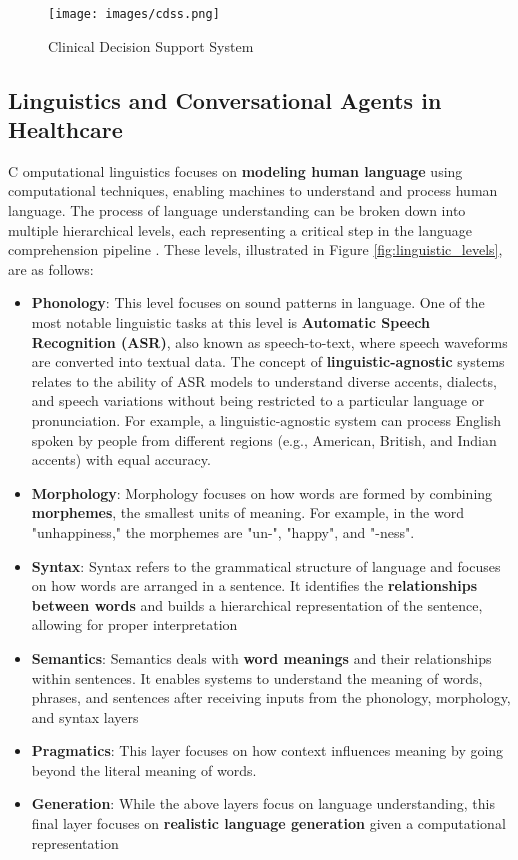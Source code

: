\begin{figure}[h]
    \centering
    \texttt{[image: images/cdss.png]}
    \caption{Clinical Decision Support System}
    \label{fig:cdss}
\end{figure}

\subsection{Linguistics and Conversational Agents in Healthcare}
\lettrine{C}{ }omputational linguistics focuses on \textcolor{TUMRed}{\textbf{modeling human language}} using computational techniques, enabling machines to understand and process human language. The process of language understanding can be broken down into multiple hierarchical levels, each representing a critical step in the language comprehension pipeline \cite{cohen2022intelligent}. These levels, illustrated in Figure \ref{fig:linguistic_levels}, are as follows:
\begin{itemize}
    \item \textcolor{TUMRed}{\textbf{Phonology}}: This level focuses on sound patterns in language. One of the most notable linguistic tasks at this level is \textcolor{TUMRed}{\textbf{Automatic Speech Recognition (ASR)}}, also known as speech-to-text, where speech waveforms are converted into textual data. The concept of \textcolor{TUMRed}{\textbf{linguistic-agnostic}} systems relates to the ability of ASR models to understand diverse accents, dialects, and speech variations without being restricted to a particular language or pronunciation. For example, a linguistic-agnostic system can process English spoken by people from different regions (e.g., American, British, and Indian accents) with equal accuracy.
    \item \textcolor{TUMRed}{\textbf{Morphology}}: Morphology focuses on how words are formed by combining \textcolor{TUMRed}{\textbf{morphemes}}, the smallest units of meaning. For example, in the word "unhappiness," the morphemes are "un-", "happy", and "-ness".
    \item \textcolor{TUMRed}{\textbf{Syntax}}: Syntax refers to the grammatical structure of language and focuses on how words are arranged in a sentence. It identifies the \textcolor{TUMRed}{\textbf{relationships between words}} and builds a hierarchical representation of the sentence, allowing for proper interpretation
    \item \textcolor{TUMRed}{\textbf{Semantics}}: Semantics deals with \textcolor{TUMRed}{\textbf{word meanings}} and their relationships within sentences. It enables systems to understand the meaning of words, phrases, and sentences after receiving inputs from the phonology, morphology, and syntax layers
    \item \textcolor{TUMRed}{\textbf{Pragmatics}}: This layer focuses on how context influences meaning by going beyond the literal meaning of words. 
    \item \textcolor{TUMRed}{\textbf{Generation}}: While the above layers focus on language understanding, this final layer focuses on \textcolor{TUMRed}{\textbf{realistic language generation}} given a computational representation 
\end{itemize}

